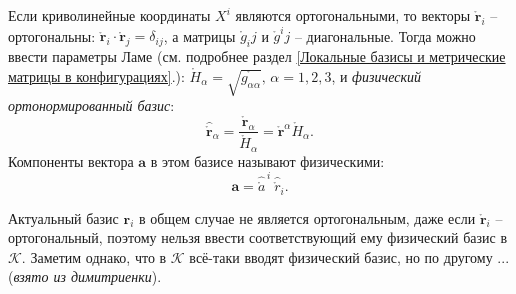
Если криволинейные координаты $X^i$ являются ортогональными, то векторы $\mathring{\mathbf{r}}_i$ -- ортогональны: $ \mathring{\mathbf{r}}_i\cdot\mathring{\mathbf{r}}_j=\delta_{ij}$, а матрицы $\mathring{g}_ij$ и $\mathring{g}^ij$ -- диагональные. Тогда можно ввести параметры Ламе (см. подробнее раздел \ref{Локальные базисы и метрические матрицы в конфигурациях}.): $\mathring{H}_\alpha=\sqrt{\mathring{g_{\alpha\alpha}}},\,\alpha=1,2,3$, и \textit{физический ортонормированный базис}:
\begin{equation*}
	\widehat{\mathring{\mathbf{r}}}_\alpha=\frac{\mathring{\mathbf{r}}_\alpha}{\mathring{H}_\alpha}=\mathring{\mathbf{r}}^\alpha\mathring{H}_\alpha.
\end{equation*}
Компоненты вектора $\mathbf{a}$ в этом базисе называют физическими:
\begin{equation*}
	\mathbf{a} = \widehat{\mathring{a}}^{\,i}~\widehat{\mathring{r}}_i.
\end{equation*}

Актуальный базис $\mathbf{r}_i$ в общем случае не является ортогональным, даже если $\mathring{\mathbf{r}}_i$ -- ортогональный, поэтому нельзя ввести соответствующий ему физический базис в $\mathcal{K}$. Заметим однако, что в $\mathcal{K}$ всё-таки вводят физический базис, но по другому ... (\textit{взято из димитриенки}).